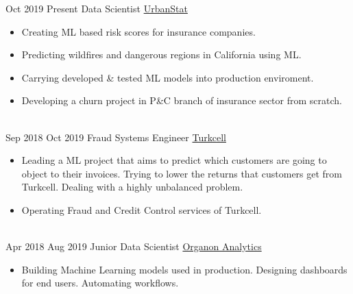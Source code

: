 \documentclass[letterpaper]{DS_class_file} %
\begin{document}
\begin{twenty}
	\twentyitem
		{Oct 2019}
		{Present}
		{\hspace{0.3cm}Data Scientist}
		{\href{https://www.urbanstat.com/}{UrbanStat}}
		{}
		{\begin{itemize}
			\item Creating ML based risk scores for insurance companies.
			\item Predicting wildfires and dangerous regions in California using ML.
			\item Carrying developed \& tested ML models into production enviroment.
			\item Developing a churn project in P\&C branch of insurance sector from scratch.
		\end{itemize}}
		\\
	\twentyitem
		{Sep 2018}
		{Oct 2019}
		{\hspace{0.3cm}Fraud Systems Engineer}
		{\href{https://www.turkcell.com.tr/}{Turkcell}}
		{}
		{\begin{itemize}
			\item Leading a ML project that aims to predict which customers are going to object to their invoices. Trying to lower the returns that customers get from Turkcell. Dealing with a highly unbalanced problem.
			\item Operating Fraud and Credit Control services of Turkcell.
		\end{itemize}}
		\\
	\twentyitem
		{Apr 2018}
		{Aug 2019}
		{\hspace{0.3cm}Junior Data Scientist}
		{\href{http://www.organonanalytics.com/pages/index.php}{Organon Analytics}}
		{}
		{\begin{itemize}
			\item Building Machine Learning models used in production. Designing dashboards for end users. Automating workflows.      
		\end{itemize}}
		\\
\end{twenty}
\end{document}
